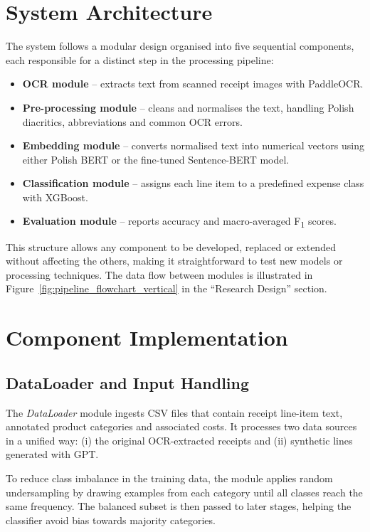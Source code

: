 \documentclass{SGGW-thesis-EN}
\begin{document}
\section{System Architecture}
The system follows a modular design organised into five sequential components, each responsible for a distinct step in
the processing pipeline:

\begin{itemize}
  \item \textbf{OCR module} – extracts text from scanned receipt images with PaddleOCR.
  \item \textbf{Pre-processing module} – cleans and normalises the text, handling Polish diacritics, abbreviations and
        common OCR errors.
  \item \textbf{Embedding module} – converts normalised text into numerical vectors using either Polish BERT or the
        fine-tuned Sentence-BERT model.
  \item \textbf{Classification module} – assigns each line item to a predefined expense class with XGBoost.
  \item \textbf{Evaluation module} – reports accuracy and macro-averaged F\textsubscript{1} scores.
\end{itemize}

This structure allows any component to be developed, replaced or extended without affecting the others, making it
straightforward to test new models or processing techniques. The data flow between modules is illustrated in
Figure~\ref{fig:pipeline_flowchart_vertical} in the “Research Design” section.

\section{Component Implementation}

\subsection{DataLoader and Input Handling}
The \textit{DataLoader} module ingests CSV files that contain receipt line-item text, annotated product categories and
associated costs. It processes two data sources in a unified way: (i) the original OCR-extracted receipts and (ii)
synthetic lines generated with GPT.

To reduce class imbalance in the training data, the module applies random undersampling by drawing examples from each
category until all classes reach the same frequency. The balanced subset is then passed to later stages, helping the
classifier avoid bias towards majority categories.
\end{document}
